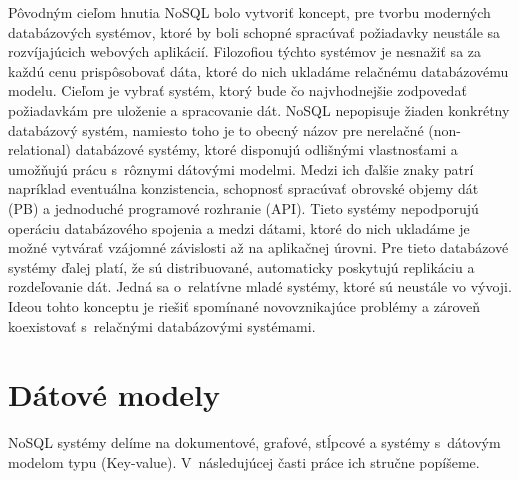 \documentclass[11pt,twoside,a4paper]{book}
\begin{document}
Pôvodným cieľom hnutia NoSQL bolo vytvoriť koncept, pre tvorbu moderných databázových systémov, ktoré by boli schopné spracúvať požiadavky neustále sa rozvíjajúcich webových aplikácií. Filozofiou týchto systémov je nesnažiť sa za každú cenu prispôsobovať dáta, ktoré do nich ukladáme relačnému databázovému modelu. Cieľom je vybrať systém, ktorý bude čo najvhodnejšie zodpovedať požiadavkám pre uloženie a spracovanie dát. NoSQL nepopisuje žiaden konkrétny databázový systém, namiesto toho je to obecný názov pre nerelačné (non-relational) databázové systémy, ktoré disponujú odlišnými vlastnosťami a umožňujú prácu s~rôznymi dátovými modelmi. Medzi ich ďalšie znaky patrí napríklad eventuálna konzistencia, schopnosť spracúvať obrovské objemy dát (PB) a jednoduché programové rozhranie (API). Tieto systémy nepodporujú operáciu databázového spojenia a medzi dátami, ktoré do nich ukladáme je možné vytvárať vzájomné závislosti až na aplikačnej úrovni. Pre tieto databázové systémy ďalej platí, že sú distribuované, automaticky poskytujú replikáciu a rozdeľovanie dát. Jedná sa o~relatívne mladé systémy, ktoré sú neustále vo vývoji. Ideou tohto konceptu je riešiť spomínané novovznikajúce problémy a zároveň koexistovať s~relačnými databázovými systémami.


\section{Dátové modely}

NoSQL systémy delíme na dokumentové, grafové, stĺpcové a systémy s~dátovým modelom typu  (Key-value). V~následujúcej časti práce ich stručne popíšeme.

% 
% 
% 
% 
\end{document}
